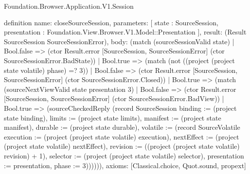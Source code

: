 \begin{lexlean}{Foundation.Browser.Application.V1.Session}
\begin{semanticmodule}
definition{
  name: closeSourceSession,
  parameters: [
    state : SourceSession,
    presentation : Foundation.View.Browser.V1.Model::Presentation
  ],
  result: (Result SourceSession SourceSessionError),
  body: (match (sourceSessionValid state)
    | Bool.false => (ctor Result.error [SourceSession, SourceSessionError] (ctor SourceSessionError.BadState))
    | Bool.true => (match (not ((project (project state volatile) phase) =? 3))
      | Bool.false => (ctor Result.error [SourceSession, SourceSessionError] (ctor SourceSessionError.Closed))
      | Bool.true => (match (sourceNextViewValid state presentation 3)
        | Bool.false => (ctor Result.error [SourceSession, SourceSessionError] (ctor SourceSessionError.BadView))
        | Bool.true => (sourceCheckedReply (record SourceSession {binding := (project state binding), limits := (project state limits), manifest := (project state manifest), durable := (project state durable), volatile := (record SourceVolatile {execution := (project (project state volatile) execution), nextEffect := (project (project state volatile) nextEffect), revision := ((project (project state volatile) revision) + 1), selector := (project (project state volatile) selector), presentation := presentation, phase := 3})}))))),
  axioms: [Classical.choice, Quot.sound, propext]
}


\end{semanticmodule}
\end{lexlean}
